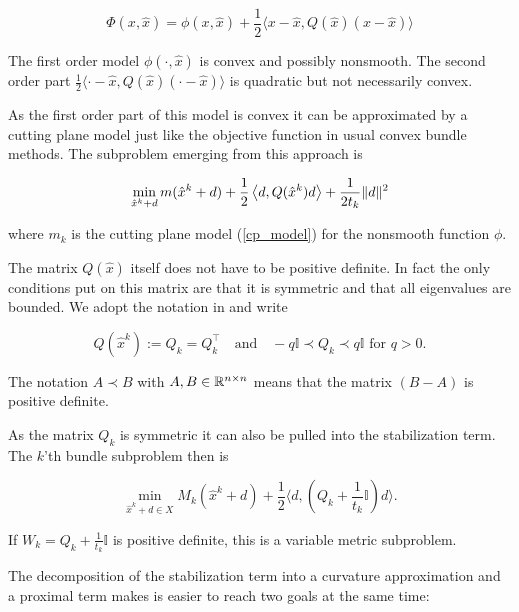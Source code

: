 \begin{equation}
	\Phi(x,\hat{x}) = \phi(x,\hat{x})+\frac{1}{2}\langle x-\hat{x},Q(\hat{x})(x-\hat{x})\rangle
\end{equation}

The first order model \(\phi(\cdot,\hat{x})\) is convex and possibly nonsmooth. The second order part \(\frac{1}{2}\langle \cdot-\hat{x},Q(\hat{x})(\cdot-\hat{x})\rangle\) is quadratic but not necessarily convex.

As the first order part of this model is convex it can be approximated by a cutting plane model just like the objective function in usual convex bundle methods. The subproblem emerging from this approach is

\begin{equation*}
	\min_{\hat{x}^k+d} m(\hat{x}^k+d)+\frac{1}{2}\left\langle d,Q(\hat{x}^k)d \right\rangle + \frac{1}{2t_k}\|d\|^2
\label{sub_prob_Noll}
\end{equation*} 

where \(m_k\) is the cutting plane model (\ref{cp_model}) for the nonsmooth function \(\phi\).

The matrix \(Q(\hat{x})\) itself does not have to be positive definite. In fact the only conditions put on this matrix are that it is symmetric and that all eigenvalues are bounded.
We adopt the notation in \cite{Noll2013} and write

\begin{equation*}
		Q(\hat{x}^k):=Q_k = Q_k^{\top} \quad \text{and} \quad -q\mathbb{I} \prec Q_k \prec q\mathbb{I} \text{ for } q > 0.
\end{equation*}

The notation \( A \prec B\) with \(A, B \in \mathbb{R}^{n\times n}\) means that the matrix \((B-A)\) is positive definite.

As the matrix \(Q_k\) is symmetric it can also be pulled into the stabilization term. The \(k\)'th bundle subproblem then is

\begin{equation}
	\min_{\hat{x}^k+d \in X} M_k(\hat{x}^k+d) + \frac{1}{2}\langle d,\left(Q_k+\frac{1}{t_k}\mathbb{I} \right) d \rangle.
	\label{Q_subprob}
\end{equation}

If \(W_k = Q_k+\frac{1}{t_k}\mathbb{I}\) is positive definite, this is a variable metric subproblem.

The decomposition of the stabilization term into a curvature approximation and a proximal term makes is easier to reach two goals at the same time:

